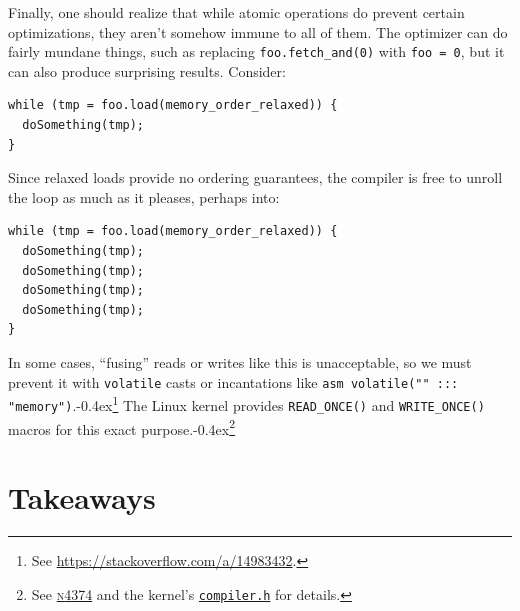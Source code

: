 \documentclass[fontsize=10pt, numbers=endperiod]{scrartcl}
\newcommand{\codesize}{\fontsize{10pt}{12pt}}
\newcommand{\punckern}{\kern-0.4ex}
\newcommand{\monobox}[1]{\mbox{\texttt{#1}}}
\newenvironment{colfigure}
  {\par\vspace{1\baselineskip minus 0.5\baselineskip}\noindent\minipage{\linewidth}}
  {\endminipage\vspace*{1\baselineskip minus 0.7\baselineskip}}
\begin{document}
\begin{multicols*}{2}
Finally, one should realize that while atomic operations do prevent certain
optimizations, they aren't somehow immune to all of them.
The optimizer can do fairly mundane things, such as replacing
\monobox{foo.fetch\_and(0)} with \monobox{foo = 0},
but it can also produce surprising results.
Consider:
\begin{colfigure}
\begin{verbatim}
while (tmp = foo.load(memory_order_relaxed)) {
  doSomething(tmp);
}
\end{verbatim}
\end{colfigure}
Since relaxed loads provide no ordering guarantees,
the compiler is free to unroll the loop as much as it pleases,
perhaps into:
\begin{colfigure}
\begin{verbatim}
while (tmp = foo.load(memory_order_relaxed)) {
  doSomething(tmp);
  doSomething(tmp);
  doSomething(tmp);
  doSomething(tmp);
}
\end{verbatim}
\end{colfigure}
In some cases, ``fusing'' reads or writes like this is unacceptable,
so we must prevent it
with \texttt{volatile} casts or incantations like
\texttt{asm volatile("" ::: "memory")}.\punckern\footnote{See
\url{https://stackoverflow.com/a/14983432}.}
The Linux kernel provides \monobox{READ\_ONCE()} and \monobox{WRITE\_ONCE()}
macros for this exact purpose.\punckern\footnote{See
\href{http://www.open-std.org/jtc1/sc22/wg21/docs/papers/2015/n4374.html}{\textsc{n}4374}
and the kernel's
\href{http://elixir.free-electrons.com/linux/latest/source/include/linux/compiler.h}{\texttt{compiler.h}}
for details.}

\section{Takeaways}


\end{multicols*}
\end{document}

